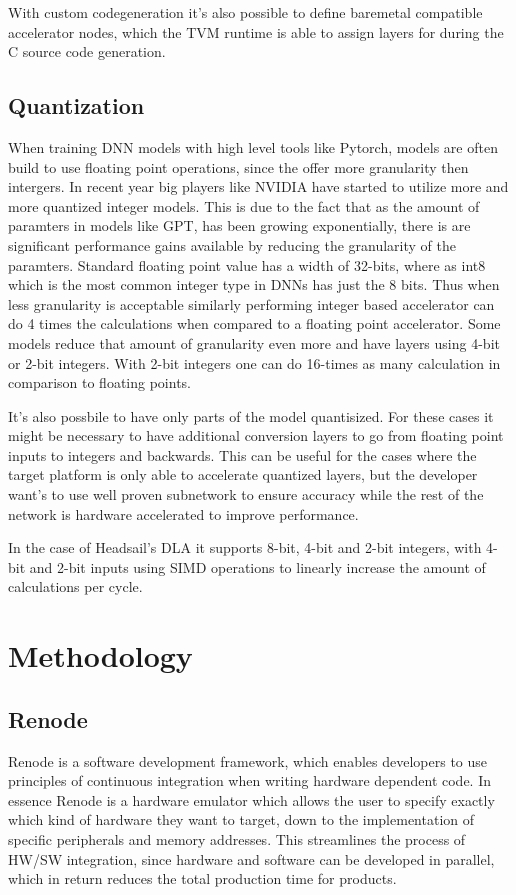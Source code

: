 \documentclass[12pt,a4paper,english
]{tunithesis}
\begin{document}
With custom codegeneration it's also possible to define baremetal compatible accelerator nodes, which the TVM runtime is able to assign layers for during the C source code generation.~\parencite{TVM}

\section{Quantization}
When training DNN models with high level tools like Pytorch, models are often build to use floating point operations, since the offer more granularity then intergers. In recent year big players like NVIDIA have started to utilize more and more quantized integer models. This is due to the fact that as the amount of paramters in models like GPT, has been growing exponentially, there is are significant performance gains available by reducing the granularity of the paramters. Standard floating point value has a width of 32-bits, where as int8 which is the most common integer type in DNNs has just the 8 bits. Thus when less granularity is acceptable similarly performing integer based accelerator can do 4 times the calculations when compared to a floating point accelerator.
Some models reduce that amount of granularity even more and have layers using 4-bit or 2-bit integers. With 2-bit integers one can do 16-times as many calculation in comparison to floating points.

It's also possbile to have only parts of the model quantisized. For these cases it might be necessary to have additional conversion layers to go from floating point inputs to integers and backwards. This can be useful for the cases where the target platform is only able to accelerate quantized layers, but the developer want's to use well proven subnetwork to ensure accuracy while the rest of the network is hardware accelerated to improve performance.

In the case of Headsail's DLA it supports 8-bit, 4-bit and 2-bit integers, with 4-bit and 2-bit inputs using SIMD operations to linearly increase the amount of calculations per cycle.

\chapter{Methodology}
\label{ch:methodology}
\section{Renode}
\label{sec:renode}
Renode is a software development framework, which enables developers to use principles of continuous integration when writing hardware dependent code. In essence Renode is a hardware emulator which allows the user to specify exactly which kind of hardware they want to target, down to the implementation of specific peripherals and memory addresses. This streamlines the process of HW/SW integration, since hardware and software can be developed in parallel, which in return reduces the total production time for products.
\end{document}

